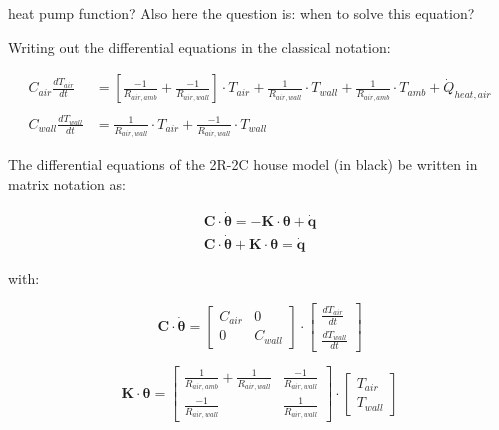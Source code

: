 {\color{red} heat pump function? Also here the question is: when to solve this equation?}


Writing out the differential equations in the classical notation:

\begin{equation}
	\begin{aligned}
		C_{air}\frac{dT_{air}}{dt} &= \left[ \frac{-1}{R_{air, amb}} + \frac{-1}{R_{air, wall}} \right]  \cdot T_{air}  + \frac{1}{R_{air, wall}} \cdot T_{wall} + \frac{1}{R_{air, amb}} \cdot T_{amb} + \dot{Q}_{heat, air}
		\\ \\
		C_{wall}\frac{dT_{wall}}{dt} &= \frac{1}{R_{air, wall}} \cdot T_{air} + \frac{-1}{R_{air, wall}}   \cdot T_{wall}
	\end{aligned}
\end{equation}

The differential equations of the 2R-2C house model (in black) be written in matrix notation as:

\begin{subequations}
	\label{eq:matnot}
	\begin{align}
		\mathbf{C} \cdot \boldsymbol{\dot{\theta}} = - \mathbf{K} \cdot \boldsymbol{\theta} + \mathbf{\dot{q}} \\ 
		\mathbf{C} \cdot \boldsymbol{\dot{\theta}} + \mathbf{K} \cdot \boldsymbol{\theta} = \mathbf{\dot{q}}
	\end{align}
\end{subequations}

with:

\begin{equation}
	\mathbf{C} \cdot \boldsymbol{\dot{\theta}} =
	\begin{bmatrix}
		C_{air} & 0 \\
		0 &  C_{wall}
	\end{bmatrix}
	\cdot
	\begin{bmatrix}
		\frac{dT_{air}}{dt} \\
		\frac{dT_{wall}}{dt}
	\end{bmatrix}
\end{equation}

\begin{equation}
	\mathbf{K} \cdot \boldsymbol{\theta} =
	\begin{bmatrix}
		\frac{1}{R_{air, amb}} + \frac{1}{R_{air, wall}} & \frac{-1}{R_{air, wall}} \\
		\frac{-1}{R_{air, wall}} &  \frac{1}{R_{air, wall}}
	\end{bmatrix}
	\cdot
	\begin{bmatrix}
		T_{air} \\
		T_{wall}
	\end{bmatrix}
\end{equation}

